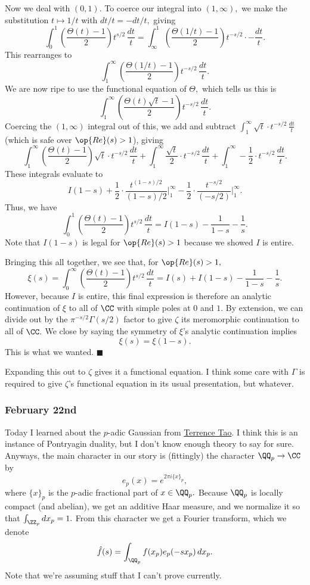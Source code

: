 Now we deal with $(0,1).$ To coerce our integral into $(1,\infty),$ we make the substitution $t\mapsto1/t$ with $dt/t=-dt/t,$ giving
\[\int_0^1\left(\frac{\Theta(t)-1}2\right)t^{s/2}\,\frac{dt}t=\int_\infty^1\left(\frac{\Theta(1/t)-1}2\right)t^{-s/2}\cdot-\frac{dt}t.\]
This rearranges to
\[\int_1^\infty\left(\frac{\Theta(1/t)-1}2\right)t^{-s/2}\,\frac{dt}t.\]
We are now ripe to use the functional equation of $\Theta,$ which tells us this is
\[\int_1^\infty\left(\frac{\Theta(t)\sqrt t-1}2\right)t^{-s/2}\,\frac{dt}t.\]
Coercing the $(1,\infty)$ integral out of this, we add and subtract $\int_1^\infty\sqrt t\cdot t^{-s/2}\,\frac{dt}t$ (which is safe over $\op{Re}(s)>1$), giving
\[\int_1^\infty\left(\frac{\Theta(t)-1}2\right)\sqrt t\cdot t^{-s/2}\,\frac{dt}t+\int_1^\infty\frac{\sqrt t}2\cdot t^{-s/2}\,\frac{dt}t+\int_1^\infty-\frac12\cdot t^{-s/2}\,\frac{dt}t.\]
These integrals evaluate to
\[I(1-s)+\frac12\cdot\frac{t^{(1-s)/2}}{(1-s)/2}\bigg|_1^\infty-\frac12\cdot\frac{t^{-s/2}}{(-s/2)}\bigg|_1^\infty.\]
Thus, we have
\[\int_0^1\left(\frac{\Theta(t)-1}2\right)t^{s/2}\,\frac{dt}t=I(1-s)-\frac1{1-s}-\frac1s.\]
Note that $I(1-s)$ is legal for $\op{Re}(s)>1$ because we showed $I$ is entire.

Bringing this all together, we see that, for $\op{Re}(s)>1,$
\[\xi(s)=\int_0^\infty\left(\frac{\Theta(t)-1}2\right)t^{s/2}\,\frac{dt}t=I(s)+I(1-s)-\frac1{1-s}-\frac1s.\]
However, because $I$ is entire, this final expression is therefore an analytic continuation of $\xi$ to all of $\CC$ with simple poles at $0$ and $1.$ By extension, we can divide out by the $\pi^{-s/2}\Gamma(s/2)$ factor to give $\zeta$ its meromorphic continuation to all of $\CC.$ We close by saying the symmetry of $\xi$'s analytic continuation implies
\[\xi(s)=\xi(1-s).\]
This is what we wanted. $\blacksquare$

Expanding this out to $\zeta$ gives it a functional equation. I think some care with $\Gamma$ is required to give $\zeta$'s functional equation in its usual presentation, but whatever.

\subsubsection{February 22nd}
Today I learned about the $p$-adic Gaussian from \href{https://terrytao.wordpress.com/2008/07/27/tates-proof-of-the-functional-equation/}{Terrence Tao}. I think this is an instance of Pontryagin duality, but I don't know enough theory to say for sure. Anyways, the main character in our story is (fittingly) the character $\QQ_p\to\CC$ by
\[e_p(x)=e^{2\pi i\{x\}_p},\]
where $\{x\}_p$ is the $p$-adic fractional part of $x\in\QQ_p.$ Because $\QQ_p$ is locally compact (and abelian), we get an additive Haar measure, and we normalize it so that $\int_{\ZZ_p}dx_p=1.$ From this character we get a Fourier transform, which we denote
\[\hat f(s)=\int_{\QQ_p}f(x_p)e_p(-sx_p)\,dx_p.\]
Note that we're assuming stuff that I can't prove currently.

